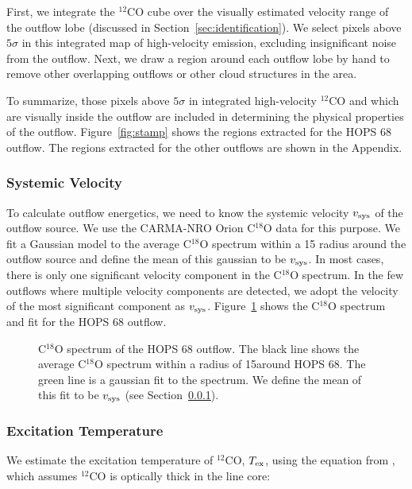 \documentclass[twocolumn]{aastex63}
\newcommand{\example}{HOPS 68}
\newcommand{\tex}{$T_{\rm ex}$}
\begin{document}
First, we integrate the $^{12}$CO cube over the visually estimated velocity range of the outflow lobe (discussed in Section~\ref{sec:identification}). We select pixels above $5\sigma$ in this integrated map of high-velocity emission, excluding insignificant noise from the outflow. Next, we draw a region around each outflow lobe by hand to remove other overlapping outflows or other cloud structures in the area. %

To summarize, those pixels above $5\sigma$ in integrated high-velocity $^{12}$CO and which are visually inside the outflow are included in determining the physical properties of the outflow. Figure~\ref{fig:stamp} shows the regions extracted for the \example{} outflow. The regions extracted for the other outflows are shown in the Appendix. 

\subsubsection{Systemic Velocity}\label{sec:vsys}
To calculate outflow energetics, we need to know the systemic velocity $v_{\rm sys}$ of the outflow source. We use the CARMA-NRO Orion C$^{18}$O data \citep{Kong18} for this purpose. We fit a Gaussian model to the average C$^{18}$O spectrum within a 15\arcsec{} radius around the outflow source and define the mean of this gaussian to be $v_{\rm sys}$. In most cases, there is only one significant velocity component in the C$^{18}$O spectrum. In the few outflows where multiple velocity components are detected, we adopt the velocity of the most significant component as $v_{\rm sys}$. Figure~\ref{fig:c18o_fit} shows the C$^{18}$O spectrum and fit for the \example{} outflow.

\begin{figure}
\caption{C$^{18}$O spectrum of the \example{} outflow. The black line shows the average C$^{18}$O spectrum within a radius of 15\arcsec around \example{}. The green line is a gaussian fit to the spectrum. We define the mean of this fit to be $v_{\rm sys}$ (see Section~\ref{sec:vsys}). \label{fig:c18o_fit}}
\end{figure}

\subsubsection{Excitation Temperature}\label{sec:tex}
We estimate the excitation temperature of $^{12}$CO, \tex, using the equation from \citet{Rohlfs96}, which assumes $^{12}$CO is optically thick in the line core:
\end{document}
